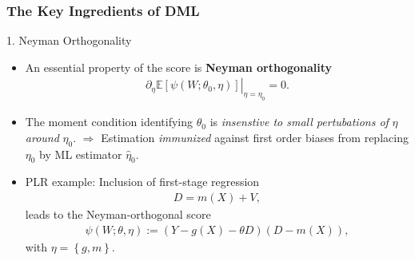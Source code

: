 \mode*

\begin{frame}
\frametitle{The Key Ingredients of DML}
\begin{block}{1. Neyman Orthogonality}
\begin{itemize}
\item An essential property of the score is \textbf{Neyman orthogonality}
\begin{align*}
\left.\partial_\eta \mathbb{E}[\psi(W; \theta_0, \eta)] \right|_{\eta=\eta_0} = 0.
\end{align*}
\item The moment condition identifying $\theta_0$ is \textit{insenstive to small pertubations of} $\eta$ \textit{around} $\eta_0$. $\Rightarrow$ Estimation \textit{immunized} against first order biases from replacing $\eta_0$ by ML estimator $\hat{\eta}_0$.
\end{itemize}
\end{block}
\begin{itemize}
\item PLR example: Inclusion of first-stage regression
\begin{align*}
D = m(X) + V, 
\end{align*}
leads to the Neyman-orthogonal score
\begin{align*}
\psi(W;\theta, \eta) := \left(Y-g(X) - \theta D \right)\left(D-m(X) \right),
\end{align*}
with $\eta=\left\{g,m \right\}$.
\end{itemize}

\end{frame}


